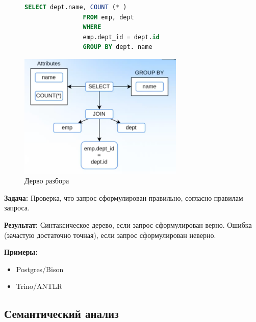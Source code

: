 \documentclass[11pt]{article}
\begin{document}
    \begin{figure}[h!]
        \begin{minipage}{0.4\textwidth}
            \begin{lstlisting}[language=SQL,
                label={lst:sql_syntax_analysis},
                caption={Пример кода}]
                SELECT dept.name, COUNT (* )
                FROM emp, dept
                WHERE
                emp.dept_id = dept.id
                GROUP BY dept. name
            \end{lstlisting}
        \end{minipage}%
        \begin{minipage}{0.7\textwidth}
            \centering
            \includegraphics*[width=0.7\textwidth]{Pictures/Relational algebra/Syntax analysis}
            \caption{Дерво разбора}
        \end{minipage}
        \label{fig:syntax_anlysis}
    \end{figure}

    \textbf{Задача:} Проверка, что запрос сформулирован правильно, согласно правилам запроса.

    \textbf{Результат:} Синтаксическое дерево, если запрос сформулирован верно.
    Ошибка (зачастую достаточно точная), если запрос сформулирован неверно.

    \textbf{Примеры:}
    \begin{itemize}
        \item Postgres/Bison
        \item Trino/ANTLR
    \end{itemize}

    \subsection*{Семантический анализ}
\end{document}
